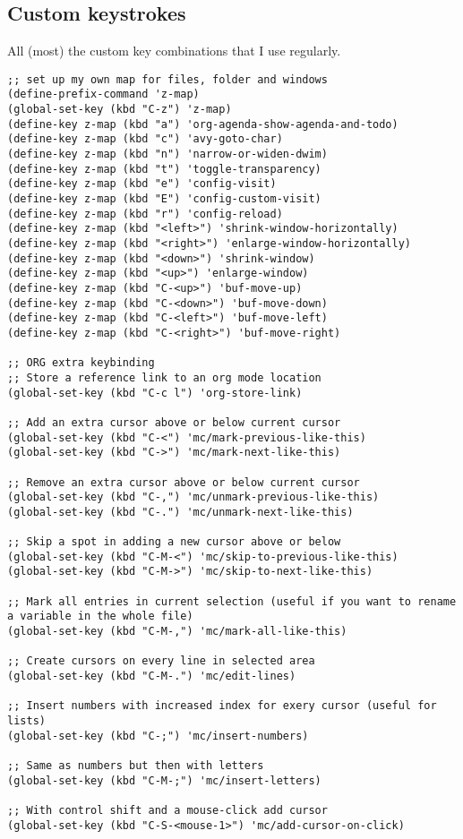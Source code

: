 \documentclass[11pt]{article}
\begin{document}
\subsection{Custom keystrokes}
\label{sec:org63af768}
All (most) the custom key combinations that I use regularly.
\begin{verbatim}
;; set up my own map for files, folder and windows
(define-prefix-command 'z-map)
(global-set-key (kbd "C-z") 'z-map)
(define-key z-map (kbd "a") 'org-agenda-show-agenda-and-todo)
(define-key z-map (kbd "c") 'avy-goto-char)
(define-key z-map (kbd "n") 'narrow-or-widen-dwim)
(define-key z-map (kbd "t") 'toggle-transparency)
(define-key z-map (kbd "e") 'config-visit)
(define-key z-map (kbd "E") 'config-custom-visit)
(define-key z-map (kbd "r") 'config-reload)
(define-key z-map (kbd "<left>") 'shrink-window-horizontally)
(define-key z-map (kbd "<right>") 'enlarge-window-horizontally)
(define-key z-map (kbd "<down>") 'shrink-window)
(define-key z-map (kbd "<up>") 'enlarge-window)
(define-key z-map (kbd "C-<up>") 'buf-move-up)
(define-key z-map (kbd "C-<down>") 'buf-move-down)
(define-key z-map (kbd "C-<left>") 'buf-move-left)
(define-key z-map (kbd "C-<right>") 'buf-move-right)

;; ORG extra keybinding
;; Store a reference link to an org mode location
(global-set-key (kbd "C-c l") 'org-store-link)

;; Add an extra cursor above or below current cursor
(global-set-key (kbd "C-<") 'mc/mark-previous-like-this)
(global-set-key (kbd "C->") 'mc/mark-next-like-this)

;; Remove an extra cursor above or below current cursor
(global-set-key (kbd "C-,") 'mc/unmark-previous-like-this)
(global-set-key (kbd "C-.") 'mc/unmark-next-like-this)

;; Skip a spot in adding a new cursor above or below
(global-set-key (kbd "C-M-<") 'mc/skip-to-previous-like-this)
(global-set-key (kbd "C-M->") 'mc/skip-to-next-like-this)

;; Mark all entries in current selection (useful if you want to rename a variable in the whole file)
(global-set-key (kbd "C-M-,") 'mc/mark-all-like-this)

;; Create cursors on every line in selected area
(global-set-key (kbd "C-M-.") 'mc/edit-lines)

;; Insert numbers with increased index for exery cursor (useful for lists)
(global-set-key (kbd "C-;") 'mc/insert-numbers)

;; Same as numbers but then with letters
(global-set-key (kbd "C-M-;") 'mc/insert-letters)

;; With control shift and a mouse-click add cursor
(global-set-key (kbd "C-S-<mouse-1>") 'mc/add-cursor-on-click)
\end{verbatim}
\end{document}
